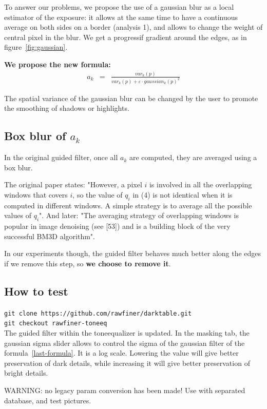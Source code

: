 \documentclass[12pt,a4paper]{article}
\begin{document}
To answer our problems, we propose the use of a gaussian blur as a local estimator of the exposure: it allows at the same time to have a continuous average on both sides on a border (analysis 1), and allows to change the weight of central pixel in the blur.
We get a progressif gradient around the edges, as in figure~\ref{fig:gaussian}.

\textbf{We propose the new formula:}
\begin{eqnarray}
a_k &=& \frac{var_k(p)}{var_k(p) + \varepsilon  \cdot  gaussian_k(p) ^ {2}}\label{last-formula}
\end{eqnarray}

The spatial variance of the gaussian blur can be changed by the user to promote the smoothing of shadows or highlights.

\subsection{Box blur of $a_k$}
In the original guided filter, once all $a_k$ are computed, they are averaged using a box blur.

The original paper states: "However, a pixel $i$ is involved in all the overlapping windows that covers $i$, so the value of $q_i$ in (4) is not identical when it is computed in different windows. A simple strategy is to average all the possible values of $q_i$". And later: "The averaging strategy of overlapping windows is popular in image denoising (see [53]) and is a building block of the very successful BM3D algorithm".

In our experiments though, the guided filter behaves much better along the edges if we remove this step, so \textbf{we choose to remove it}.

\subsection{How to test}
\texttt{git clone https://github.com/rawfiner/darktable.git}\\
\texttt{git checkout rawfiner-toneeq}\\

The guided filter within the toneequalizer is updated. In the masking tab, the gaussian sigma slider allows to control the sigma of the gaussian filter of the formula~\ref{last-formula}. It is a log scale. Lowering the value will give better preservation of dark details, while increasing it will give better preservation of bright details.

WARNING: no legacy param conversion has been made! Use with separated database, and test pictures.
\end{document}
